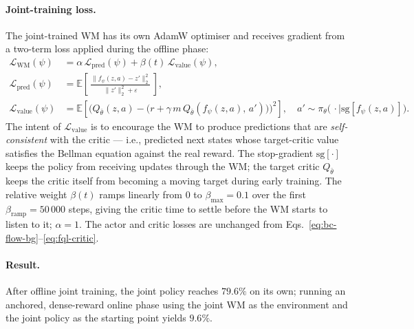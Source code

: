 \paragraph{Joint-training loss.} The joint-trained WM has its own AdamW optimiser and receives gradient from a two-term loss applied during the offline phase:
\begin{align}
    \mathcal{L}_{\text{WM}}(\psi) &= \alpha\,\mathcal{L}_{\text{pred}}(\psi) + \beta(t)\,\mathcal{L}_{\text{value}}(\psi),
    \label{eq:oo-joint}\\
    \mathcal{L}_{\text{pred}}(\psi) &= \mathbb{E}\!\left[\,
        \frac{\|f_\psi(z, a) - z'\|_2^2}{\|z'\|_2^2 + \varepsilon}\,\right],
    \label{eq:oo-pred}\\
    \mathcal{L}_{\text{value}}(\psi) &= \mathbb{E}\!\left[\Big(
        Q_{\bar\theta}(z, a) - \big(r + \gamma\, m\, Q_{\bar\theta}(f_\psi(z, a),\, a')\big)\Big)^2\right],
    \quad a' \sim \pi_\theta\big(\,\cdot\mid \mathrm{sg}[f_\psi(z, a)]\big).
    \label{eq:oo-value}
\end{align}
The intent of $\mathcal{L}_{\text{value}}$ is to encourage the WM to produce predictions that are \emph{self-consistent} with the critic --- i.e., predicted next states whose target-critic value satisfies the Bellman equation against the real reward. The stop-gradient $\mathrm{sg}[\cdot]$ keeps the policy from receiving updates through the WM; the target critic $Q_{\bar\theta}$ keeps the critic itself from becoming a moving target during early training. The relative weight $\beta(t)$ ramps linearly from $0$ to $\beta_{\max} = 0.1$ over the first $\beta_{\text{ramp}} = 50\,000$ steps, giving the critic time to settle before the WM starts to listen to it; $\alpha = 1$. The actor and critic losses are unchanged from Eqs.~\eqref{eq:bc-flow-bg}--\eqref{eq:fql-critic}.

\paragraph{Result.} After offline joint training, the joint policy reaches $79.6\%$ on its own; running an anchored, dense-reward online phase using the joint WM as the environment and the joint policy as the starting point yields $9.6\%$.

